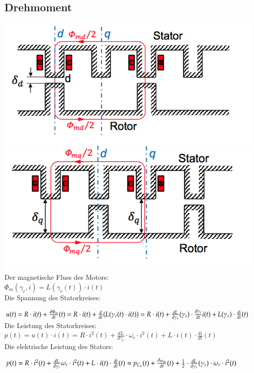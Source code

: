 \subsection{Drehmoment}
\begin{minipage}{0.5 \linewidth}
\includegraphics[width = \linewidth]{./Pics/VL67/Drehmoment}\\
\includegraphics[width = \linewidth]{./Pics/VL67/Drehmoment2} \\

Der magnetische Fluss des Motors: \\

$\Phi_m (\gamma_r,i) = L(\gamma_r(t)) \cdot i(t)$\\

Die Spannung des Statorkreises: 

$u(t)  = R \cdot i(t) + \frac{d\Phi_m}{dt}(t)  = R \cdot i(t) + \frac{d}{dt}(L(\gamma_r(t) \cdot i(t)) \\
 =  R \cdot i(t) + \frac{dL}{d\gamma_r}(\gamma_r) \cdot \frac{d\gamma_r}{dt}i(t) + L(\gamma_r) \cdot \frac{di}{dt}(t)$ \\
 
 Die Leistung des Statorkreises: \\
 
 $p(t) = u(t) \cdot i(t) = R \cdot i^2(t) + \frac{dL}{d\gamma_r} \cdot \omega_r \cdot i^2(t) + L \cdot i(t) \cdot \frac{di}{dt}(t)$\\
 
 Die elektrische Leistung des Stators: 
 
 $p(t) = R \cdot i^2(t) + \frac{dL}{d\gamma_r} \omega_r \cdot i^2(t) + L \cdot i(t) \cdot \frac{di}{dt}(t) \\ 
 = p_{C_u}(t) + \frac{d_{W_m}}{dt}(t) + \frac{1}{2} \cdot \frac{dL}{d \gamma_r}(\gamma_r) \cdot \omega_r \cdot i^2(t)$ \\
 
\end{minipage}
